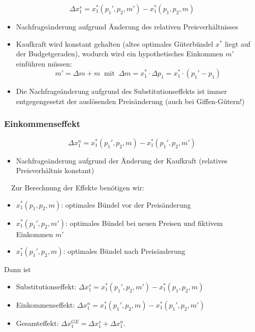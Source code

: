 $$ \Delta x_1^{s} = x_1^*(p_1', p_2, m') - x_1^*(p_1, p_2, m) $$

\begin{itemize}
	\item Nachfrageänderung aufgrund Änderung des relativen Preisverhältnisses
	\item Kaufkraft wird konstant gehalten (altes optimales Güterbündel $x^*$ liegt auf der Budgetgeraden), wodurch wird ein hypothetisches Einkommen $m'$ einführen müssen:
		$$ m' = \Delta m + m ~\text{ mit } ~\Delta m = x_1^* \cdot \Delta p_1 = x_1^* \cdot (p_1' - p_1)  $$
	\item Die Nachfrageänderung aufgrund des Substitutionseffekts ist immer entgegengesetzt der auslösenden Preisänderung (auch bei Giffen-Gütern!)
\end{itemize}

\subsubsection*{Einkommenseffekt}

$$ \Delta x_1^{n} = x_1^{*}(p_1', p_2, m) - x_1^*(p_1', p_2, m') $$

\begin{itemize}
	\item Nachfrageänderung aufgrund der Änderung der Kaufkraft (relatives Preisverhältnis konstant)
\end{itemize}

\begin{kr} ~\
	Zur Berechnung der Effekte benötigen wir:
	\begin{itemize}
		\item $x_1^*(p_1, p_2, m)$: optimales Bündel vor der Preisänderung
		\item $x_1^*(p_1', p_2, m')$: optimales Bündel bei neuen Preisen und fiktivem Einkommen $m'$
		\item $x_1^*(p_1', p_2, m)$: optimales Bündel nach Preisänderung
	\end{itemize}
	Dann ist
	\begin{itemize}
		\item Substitutionseffekt: $\Delta x_1^{s} = x_1^*(p_1', p_2, m') - x_1^*(p_1, p_2, m)$
		\item Einkommenseffekt: $\Delta x_1^{n} = x_1^{*}(p_1', p_2, m) - x_1^*(p_1', p_2, m')$
		\item Gesamteffekt: $\Delta x_1^{GE} = \Delta x_1^{s} + \Delta x_1^{n}$.
	\end{itemize}
\end{kr}

